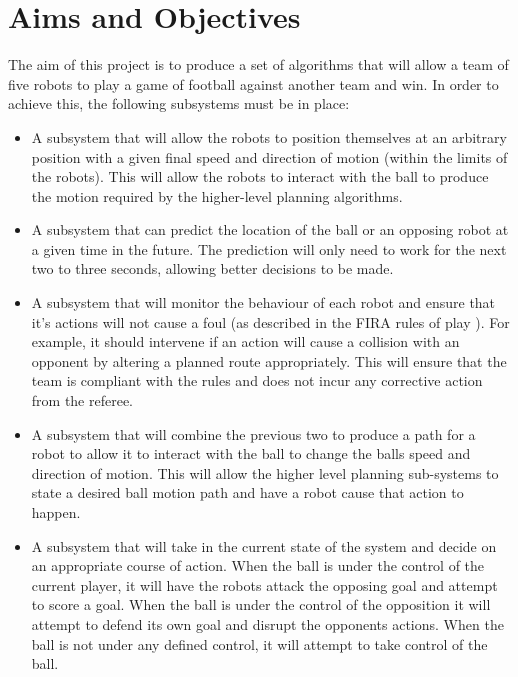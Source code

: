 \documentclass[a4paper,10pt]{article}
\begin{document}
\section{Aims and Objectives}
The aim of this project is to produce a set of algorithms that will allow a team of five robots to play a game of football against another team and win.  In order to achieve this, the following subsystems must be in place:

\begin{itemize}
\item A subsystem that will allow the robots to position themselves at an arbitrary position with a given final speed and direction of motion (within the limits of the robots).  This will allow the robots to interact with the ball to produce the motion required by the higher-level planning algorithms.

\item A subsystem that can predict the location of the ball or an opposing robot at a given time in the future.  The prediction will only need to work for the next two to three seconds, allowing better decisions to be made.

\item A subsystem that will monitor the behaviour of each robot and ensure that it's actions will not cause a foul (as described in the \ac{FIRA} rules of play \cite{simurosotSim}).  For example, it should intervene if an action will cause a collision with an opponent by altering a planned route appropriately.  This will ensure that the team is compliant with the rules and does not incur any corrective action from the referee.

\item A subsystem that will combine the previous two to produce a path for a robot to allow it to interact with the ball to change the balls speed and direction of motion.  This will allow the higher level planning sub-systems to state a desired ball motion path and have a robot cause that action to happen.

\item A subsystem that will take in the current state of the system and decide on an appropriate course of action. When the ball is under the control of the current player, it will have the robots attack the opposing goal and attempt to score a goal.  When the ball is under the control of the opposition it will attempt to defend its own goal and disrupt the opponents actions. When the ball is not under any defined control, it will attempt to take control of the ball.
\end{itemize}
\end{document}

